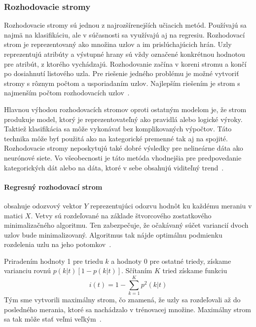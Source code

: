 \documentclass[a4paper,slovak,12pt,appendix]{article}
\begin{document}

\subsubsection{Rozhodovacie stromy}
Rozhodovacie stromy sú jednou z najrozšírenejších učiacich metód. Používajú sa
najmä na klasifikáciu, ale v súčasnosti sa využívajú aj na regresiu.
Rozhodovací strom je reprezentovaný ako množina uzlov a im prislúchajúcich
hrán. Uzly reprezentujú atribúty a výstupné hrany sú vždy označené konkrétnou
hodnotou pre atribút, z ktorého vychádzajú. Rozhodovanie začína v koreni stromu
a končí po dosiahnutí listového uzla. Pre riešenie jedného problému je možné
vytvoriť stromy s rôznym počtom a usporiadaním uzlov. Najlepším riešením je
strom s najmenším počtom rozhodovacích uzlov~\cite{Merz1998}.

Hlavnou výhodou rozhodovacích stromov oproti ostatným modelom je, že strom
produkuje model, ktorý je reprezentovateľný ako pravidlá alebo logické výroky.
Taktiež klasifikácia sa môže vykonávať bez komplikovaných výpočtov. Táto
technika môže byť použitá ako na kategorické premenné tak aj na spojité.
Rozhodovacie stromy neposkytujú také dobré výsledky pre nelineárne dáta ako
neurónové siete. Vo všeobecnosti je táto metóda vhodnejšia pre predpovedanie
kategorických dát alebo na dáta, ktoré v sebe obsahujú viditeľný
trend~\cite{Tso2007}.


\paragraph{Regresný rozhodovací strom} obsahuje odozvový vektor $Y$
reprezentujúci odozvu hodnôt ku každému meraniu v matici $X$. Vetvy sú
rozdeľované na základe štvorcového zostatkového minimalizačného algoritmu.
Ten zabezpečuje, že očakávaný súčet variancií dvoch uzlov bude minimalizovaný.
Algoritmus tak nájde optimálnu podmienku rozdelenia uzlu na jeho
potomkov~\cite{Bel2009}.

Priradením hodnoty 1 pre triedu $k$ a hodnoty 0 pre ostatné triedy, získame
varianciu rovnú $p(k|t)[1 - p(k|t)]$. Sčítaním $K$ tried získame funkciu
\begin{equation}
  i(t) = 1 - \sum_{k = 1}^K p^2 (k|t)
  \label{eq-tree-impurity}
\end{equation}
Tým sme vytvorili maximálny strom, čo znamená, že uzly sa rozdeľovali až do
posledného merania, ktoré sa nachádzalo v trénovacej množine. Maximálny strom
sa tak môže stať veľmi veľkým~\cite{Bel2009}.
\end{document}

